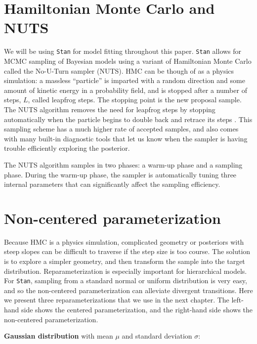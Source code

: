 \documentclass[11pt, oneside, openany]{scrbook}
\begin{document}
\hypertarget{hamiltonian-monte-carlo-and-nuts}{%
\section{Hamiltonian Monte Carlo and NUTS}\label{hamiltonian-monte-carlo-and-nuts}}

We will be using \texttt{Stan} for model fitting throughout this paper. \texttt{Stan} allows for MCMC sampling of Bayesian models using a variant of Hamiltonian Monte Carlo called the No-U-Turn sampler (NUTS). HMC can be though of as a physics simulation: a massless ``particle'' is imparted with a random direction and some amount of kinetic energy in a probability field, and is stopped after a number of steps, \(L\), called leapfrog steps. The stopping point is the new proposal sample. The NUTS algorithm removes the need for leapfrog steps by stopping automatically when the particle begins to double back and retrace its steps \citep{hoffman2014no}. This sampling scheme has a much higher rate of accepted samples, and also comes with many built-in diagnostic tools that let us know when the sampler is having trouble efficiently exploring the posterior.

The NUTS algorithm samples in two phases: a warm-up phase and a sampling phase. During the warm-up phase, the sampler is automatically tuning three internal parameters that can significantly affect the sampling efficiency.

\hypertarget{non-centered-parameterization}{%
\section{Non-centered parameterization}\label{non-centered-parameterization}}

Because HMC is a physics simulation, complicated geometry or posteriors with steep slopes can be difficult to traverse if the step size is too course. The solution is to explore a simpler geometry, and then transform the sample into the target distribution. Reparameterization is especially important for hierarchical models. For \texttt{Stan}, sampling from a standard normal or uniform distribution is very easy, and so the non-centered parameterization can alleviate divergent transitions. Here we present three reparameterizations that we use in the next chapter. The left-hand side shows the centered parameterization, and the right-hand side shows the non-centered parameterization.

\textbf{Gaussian distribution} with mean \(\mu\) and standard deviation \(\sigma\):
\end{document}
